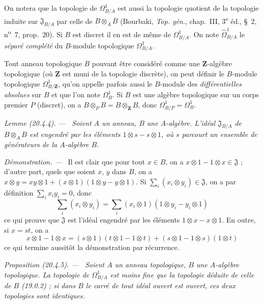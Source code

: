 \documentclass[10pt,oneside]{book}
\makeatletter
\newcommand{\setmanualcurrentlabel}[1]{\def\@currentlabel{#1}}
\newenvironment{proposition}[1][]{%
  \setmanualcurrentlabel{#1}\par\medskip\noindent\itshape Proposition (#1). ---\ }{\par}
\newenvironment{lemma}[1][]{%
  \setmanualcurrentlabel{#1}\par\medskip\noindent\itshape Lemme (#1). ---\ }{\par}
\newenvironment{proof}{%
  \par\medskip\noindent\textit{Démonstration. ---\ }}{\par}
\makeatother
\begin{document}
On notera que la topologie de $\Omega^1_{B/A}$ est aussi la topologie quotient
de la topologie induite sur $\mathfrak{J}_{B/A}$ par celle de
$B\otimes_A B$ (Bourbaki, \emph{Top. gén.}, chap.~III, 3\textsuperscript{e}
éd., §~2, n\textsuperscript{o}~7, prop.~20). Si $B$ est discret il en est de
même de $\Omega^1_{B/A}$. On note $\widehat{\Omega}^1_{B/A}$ le
\emph{séparé complété} du $B$-module topologique $\Omega^1_{B/A}$.

Tout anneau topologique $B$ pouvant être considéré comme une
$\mathbf{Z}$-algèbre topologique (où $\mathbf{Z}$ est muni de la topologie
discrète), on peut définir le $B$-module topologique $\Omega^1_{B/\mathbf{Z}}$,
qu'on appelle parfois aussi le $B$-module des \emph{différentielles absolues}
sur $B$ et que l'on note $\Omega^1_B$. Si $B$ est une algèbre topologique sur
un corps premier $P$ (discret), on a
$B\otimes_P B=B\otimes_{\mathbf{Z}}B$, donc
$\Omega^1_{B/P}=\Omega^1_B$.

\begin{lemma}[20.4.4]
\label{0.20.4.4-fr}
Soient $A$ un anneau, $B$ une $A$-algèbre. L'idéal $\mathfrak{J}_{B/A}$ de
$B\otimes_A B$ est engendré par les éléments $1\otimes s-s\otimes1$, où $s$
parcourt un ensemble de générateurs de la $A$-algèbre $B$.
\end{lemma}

\begin{proof}
Il est clair que pour tout $x\in B$, on a
$x\otimes1-1\otimes x\in\mathfrak{J}$ ; d'autre part, quels que soient $x$,
$y$ dans $B$, on a
$x\otimes y=xy\otimes1+(x\otimes1)(1\otimes y-y\otimes1)$. Si
$\sum_i(x_i\otimes y_i)\in\mathfrak{J}$, on a par définition
$\sum_i x_i y_i=0$, donc
\begin{equation}
\tag{20.4.4.1}
\label{0.20.4.4.1-fr}
  \sum_i(x_i\otimes y_i)=
  \sum_i(x_i\otimes1)(1\otimes y_i-y_i\otimes1)
\end{equation}
ce qui prouve que $\mathfrak{J}$ est l'idéal engendré par les éléments
$1\otimes x-x\otimes1$. En outre, si $x=st$, on a
\begin{equation}
\tag{20.4.4.2}
\label{0.20.4.4.2-fr}
  x\otimes1-1\otimes x=(s\otimes1)(t\otimes1-1\otimes t)
  +(s\otimes1-1\otimes s)(1\otimes t)
\end{equation}
ce qui termine aussitôt la démonstration par récurrence.
\end{proof}

\begin{proposition}[20.4.5]
\label{0.20.4.5-fr}
Soient $A$ un anneau topologique, $B$ une $A$-algèbre topologique. La
topologie de $\Omega^1_{B/A}$ est moins fine que la topologie déduite de celle
de $B$ (19.0.2) ; si dans $B$ le carré de tout idéal ouvert est ouvert, ces
deux topologies sont identiques.
\end{proposition}
\end{document}

